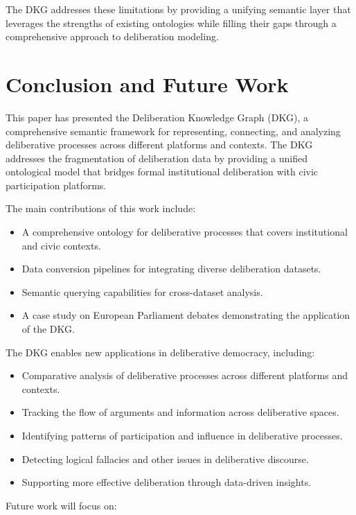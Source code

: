 \documentclass[runningheads]{llncs}  %
\begin{document}
The DKG addresses these limitations by providing a unifying semantic layer that leverages the strengths of existing ontologies while filling their gaps through a comprehensive approach to deliberation modeling.

\section{Conclusion and Future Work}
This paper has presented the Deliberation Knowledge Graph (DKG), a comprehensive semantic framework for representing, connecting, and analyzing deliberative processes across different platforms and contexts. The DKG addresses the fragmentation of deliberation data by providing a unified ontological model that bridges formal institutional deliberation with civic participation platforms.

The main contributions of this work include:

\begin{itemize}
    \item A comprehensive ontology for deliberative processes that covers institutional and civic contexts.
    \item Data conversion pipelines for integrating diverse deliberation datasets.
    \item Semantic querying capabilities for cross-dataset analysis.
    \item A case study on European Parliament debates demonstrating the application of the DKG.
\end{itemize}

The DKG enables new applications in deliberative democracy, including:

\begin{itemize}
    \item Comparative analysis of deliberative processes across different platforms and contexts.
    \item Tracking the flow of arguments and information across deliberative spaces.
    \item Identifying patterns of participation and influence in deliberative processes.
    \item Detecting logical fallacies and other issues in deliberative discourse.
    \item Supporting more effective deliberation through data-driven insights.
\end{itemize}

Future work will focus on:
\end{document}
